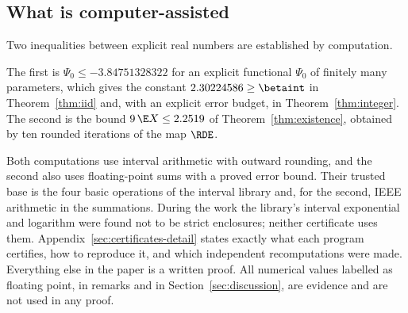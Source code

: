 \subsection{What is computer-assisted}\label{sec:intro-computer}

Two inequalities between explicit real numbers are established by computation.

The first is $\Psi_0\le-3.84751328322$ for an explicit functional $\Psi_0$ of finitely many
parameters, which gives the constant $2.30224586\ge\betaint$ in Theorem~\ref{thm:iid} and,
with an explicit error budget, in Theorem~\ref{thm:integer}. The second is the bound
$9\,\E X\le2.2519$ of Theorem~\ref{thm:existence}, obtained by ten rounded iterations of the
map $\RDE$.

Both computations use interval arithmetic with outward rounding, and the second also uses
floating-point sums with a proved error bound. Their trusted base is the four basic
operations of the interval library and, for the second, IEEE arithmetic in the summations.
During the work the library's interval exponential and logarithm were found not to be strict
enclosures; neither certificate uses them. Appendix~\ref{sec:certificates-detail} states exactly what
each program certifies, how to reproduce it, and which independent recomputations were made.
Everything else in the paper is a written proof. All numerical values labelled as floating
point, in remarks and in Section~\ref{sec:discussion}, are evidence and are not used in any
proof.
